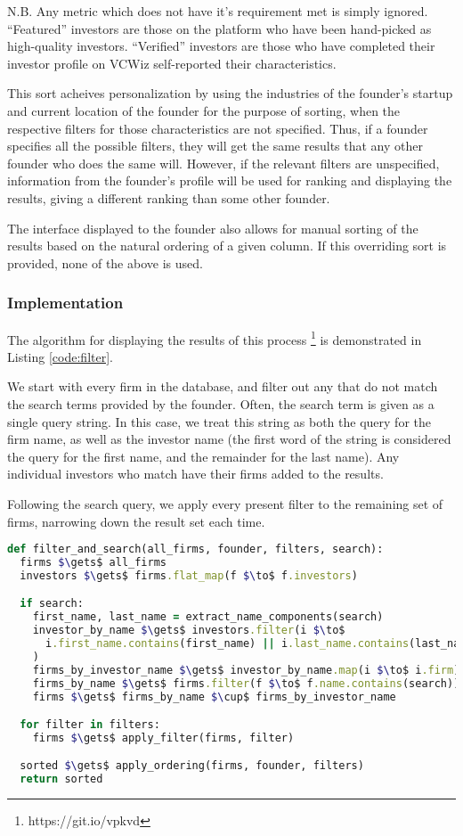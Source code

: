 N.B. Any metric which does not have it's requirement met is simply ignored. ``Featured'' investors are those on the platform who have been hand-picked as high-quality investors. ``Verified'' investors are those who have completed their investor profile on VCWiz self-reported their characteristics.

This sort acheives personalization by using the industries of the founder's startup and current location of the founder for the purpose of sorting, when the respective filters for those characteristics are not specified. Thus, if a founder specifies all the possible filters, they will get the same results that any other founder who does the same will. However, if the relevant filters are unspecified, information from the founder's profile will be used for ranking and displaying the results, giving a different ranking than some other founder.

The interface displayed to the founder also allows for manual sorting of the results based on the natural ordering of a given column. If this overriding sort is provided, none of the above is used.

\subsubsection{Implementation}

The algorithm for displaying the results of this process \footnote{https://git.io/vpkvd} is demonstrated in Listing \ref{code:filter}.

We start with every firm in the database, and filter out any that do not match the search terms provided by the founder. Often, the search term is given as a single query string. In this case, we treat this string as both the query for the firm name, as well as the investor name (the first word of the string is considered the query for the first name, and the remainder for the last name). Any individual investors who match have their firms added to the results.

Following the search query, we apply every present filter to the remaining set of firms, narrowing down the result set each time.

\begin{lstlisting}[float,frame=single,mathescape=true,language=Ruby,basicstyle=\footnotesize,columns=fullflexible,caption={Filter and Search},label={code:filter}]
def filter_and_search(all_firms, founder, filters, search):
  firms $\gets$ all_firms
  investors $\gets$ firms.flat_map(f $\to$ f.investors)

  if search:
    first_name, last_name = extract_name_components(search)
    investor_by_name $\gets$ investors.filter(i $\to$
      i.first_name.contains(first_name) || i.last_name.contains(last_name)
    )
    firms_by_investor_name $\gets$ investor_by_name.map(i $\to$ i.firm)
    firms_by_name $\gets$ firms.filter(f $\to$ f.name.contains(search))
    firms $\gets$ firms_by_name $\cup$ firms_by_investor_name

  for filter in filters:
    firms $\gets$ apply_filter(firms, filter)

  sorted $\gets$ apply_ordering(firms, founder, filters)
  return sorted
\end{lstlisting}


